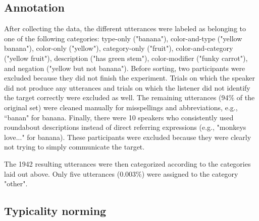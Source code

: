 \documentclass[10pt,letterpaper]{article}
\begin{document}
\subsection{Annotation}
After collecting the data, the different utterances were labeled as belonging to one of the following categories: type-only ("banana"), color-and-type ("yellow banana"),  color-only ("yellow"), category-only ("fruit"), color-and-category ("yellow fruit"), description ("has green stem"), color-modifier ("funky carrot"), and negation ("yellow but not banana"). Before sorting, two participants were excluded because they did not finish the experiment. Trials on which the speaker did not produce any utterances and trials on which the listener did not identify the target correctly were excluded as well. The remaining utterances (94\% of the original set) were cleaned manually for misspellings and abbreviations, e.g., ``banan" for banana. Finally, there were 10 speakers who consistently used roundabout descriptions instead of direct referring expressions (e.g., "monkeys love..." for banana). These participants were excluded because they were clearly not trying to simply communicate the target.

The 1942 resulting utterances were then categorized according to the categories laid out above. Only five utterances (0.003\%) were assigned to the category "other".




\subsection{Typicality norming}
\end{document}
